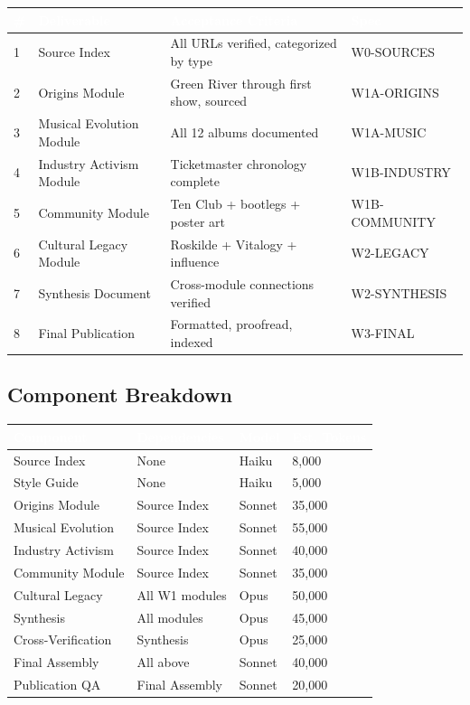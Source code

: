 \documentclass[11pt,letterpaper]{article}
\newcommand{\tableheader}[1]{\textbf{\sffamily\textcolor{white}{#1}}}
\begin{document}
\begin{center}
\begin{tabularx}{\textwidth}{C{0.6cm}L{4cm}XL{2.5cm}}
\toprule
{}
\tableheader{\#} & \tableheader{Deliverable} & \tableheader{Acceptance Criteria} & \tableheader{Spec} \\
 & Source Index & All URLs verified, categorized by type & W0-SOURCES \\
2 & Origins Module & Green River through first show, sourced & W1A-ORIGINS \\
3 & Musical Evolution Module & All 12 albums documented & W1A-MUSIC \\
4 & Industry Activism Module & Ticketmaster chronology complete & W1B-INDUSTRY \\
5 & Community Module & Ten Club + bootlegs + poster art & W1B-COMMUNITY \\
6 & Cultural Legacy Module & Roskilde + Vitalogy + influence & W2-LEGACY \\
7 & Synthesis Document & Cross-module connections verified & W2-SYNTHESIS \\
8 & Final Publication & Formatted, proofread, indexed & W3-FINAL \\
\bottomrule
\end{tabularx}
\end{center}

\subsection{Component Breakdown}

\begin{center}
\begin{tabularx}{\textwidth}{L{3.5cm}L{2.5cm}C{1.5cm}C{2cm}}
\toprule
{}
\tableheader{Component} & \tableheader{Dependencies} & \tableheader{Model} & \tableheader{Est. Tokens} \\
\midrule
Source Index & None & Haiku & 8,000 \\
Style Guide & None & Haiku & 5,000 \\
Origins Module & Source Index & Sonnet & 35,000 \\
Musical Evolution & Source Index & Sonnet & 55,000 \\
Industry Activism & Source Index & Sonnet & 40,000 \\
Community Module & Source Index & Sonnet & 35,000 \\
Cultural Legacy & All W1 modules & Opus & 50,000 \\
Synthesis & All modules & Opus & 45,000 \\
Cross-Verification & Synthesis & Opus & 25,000 \\
Final Assembly & All above & Sonnet & 40,000 \\
Publication QA & Final Assembly & Sonnet & 20,000 \\
\bottomrule
\end{tabularx}
\end{center}
\end{document}
